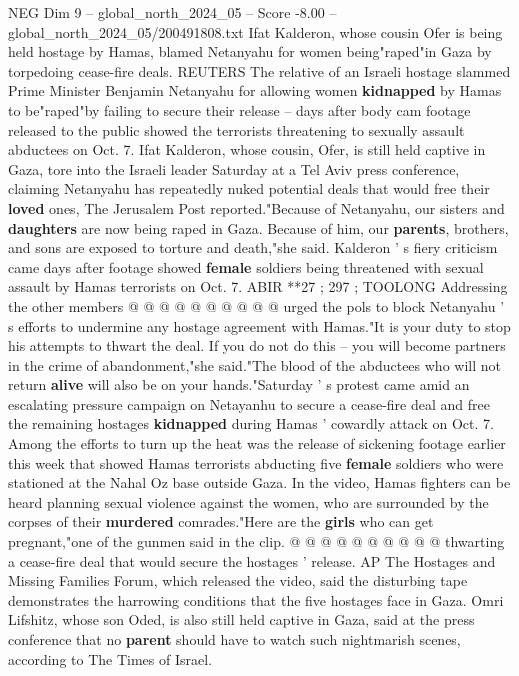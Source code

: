 \begin{textsample}{NEG Dim 9 – global\_north\_2024\_05 – Score -8.00 – global\_north\_2024\_05/200491808.txt}  \label{ex:f9_neg_235}
Ifat Kalderon, whose cousin Ofer is being held hostage by Hamas, blamed Netanyahu for women being"raped"in Gaza by torpedoing cease-fire deals.
REUTERS The relative of an Israeli hostage slammed Prime Minister Benjamin Netanyahu for allowing women \textbf{kidnapped} by Hamas to be"raped"by failing to secure their release -- days after body cam footage released to the public showed the terrorists threatening to sexually assault abductees on Oct. 7.
Ifat Kalderon, whose cousin, Ofer, is still held captive in Gaza, tore into the Israeli leader Saturday at a Tel Aviv press conference, claiming Netanyahu has repeatedly nuked potential deals that would free their \textbf{loved} ones, The Jerusalem Post reported."Because of Netanyahu, our sisters and \textbf{daughters} are now being raped in Gaza.
Because of him, our \textbf{parents}, brothers, and sons are exposed to torture and death,"she said.
Kalderon ' s fiery criticism came days after footage showed \textbf{female} soldiers being threatened with sexual assault by Hamas terrorists on Oct. 7.
ABIR **27 ; 297 ; TOOLONG Addressing the other members @ @ @ @ @ @ @ @ @ @ urged the pols to block Netanyahu ' s efforts to undermine any hostage agreement with Hamas."It is your duty to stop his attempts to thwart the deal.
If you do not do this -- you will become partners in the crime of abandonment,"she said."The blood of the abductees who will not return \textbf{alive} will also be on your hands."Saturday ' s protest came amid an escalating pressure campaign on Netayanhu to secure a cease-fire deal and free the remaining hostages \textbf{kidnapped} during Hamas ' cowardly attack on Oct. 7.
Among the efforts to turn up the heat was the release of sickening footage earlier this week that showed Hamas terrorists abducting five \textbf{female} soldiers who were stationed at the Nahal Oz base outside Gaza.
In the video, Hamas fighters can be heard planning sexual violence against the women, who are surrounded by the corpses of their \textbf{murdered} comrades."Here are the \textbf{girls} who can get pregnant,"one of the gunmen said in the clip. @ @ @ @ @ @ @ @ @ @ thwarting a cease-fire deal that would secure the hostages ' release.
AP The Hostages and Missing Families Forum, which released the video, said the disturbing tape demonstrates the harrowing conditions that the five hostages face in Gaza.
Omri Lifshitz, whose son Oded, is also still held captive in Gaza, said at the press conference that no \textbf{parent} should have to watch such nightmarish scenes, according to The Times of Israel.

\end{textsample}
